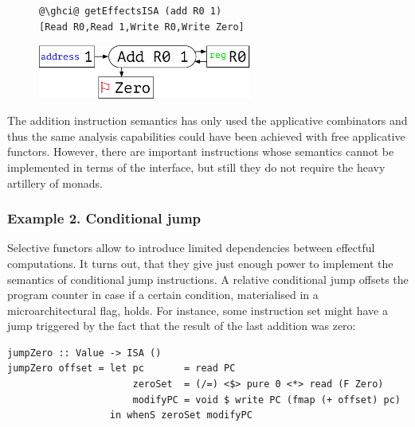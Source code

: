 \begin{figure}[!h]
 \begin{minipage}{0.45\textwidth}
\raggedleft
\begin{verbatim}
@\ghci@ getEffectsISA (add R0 1)
[Read R0,Read 1,Write R0,Write Zero]
\end{verbatim}
 \end{minipage}
 \begin{minipage}{0.45\textwidth}
  \centering
  \includegraphics[width=7cm]{./fig/add.pdf}
 \end{minipage}
\end{figure}

The addition instruction semantics has only used the applicative combinators and thus
the same analysis capabilities could have been achieved with free applicative functors.
However, there are important instructions whose semantics cannot be implemented in terms
of the  interface, but still they do not require the heavy artillery of monads.

\subsubsection{\textbf{Example 2. Conditional jump}}

Selective functors allow to introduce limited dependencies between effectful computations.
It turns out, that they give just enough power to implement the semantics of conditional
jump instructions. A relative conditional jump offsets the program counter in case if a
certain condition, materialised in a microarchitectural flag, holds. For instance, some
instruction set might have a jump triggered by the fact that the result of the last addition
was zero:

\begin{verbatim}
jumpZero :: Value -> ISA ()
jumpZero offset = let pc       = read PC
                      zeroSet  = (/=) <$> pure 0 <*> read (F Zero)
                      modifyPC = void $ write PC (fmap (+ offset) pc)
                  in whenS zeroSet modifyPC
\end{verbatim}

